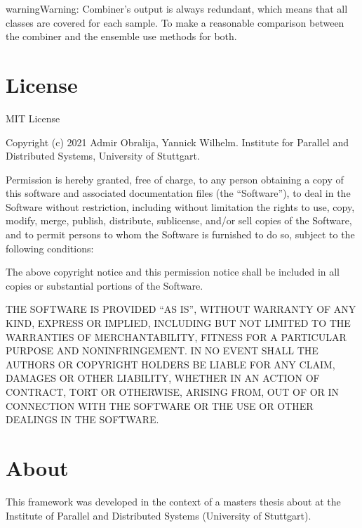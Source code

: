 \documentclass[letterpaper,10pt,english]{sphinxmanual}
\begin{document}
\begin{sphinxadmonition}{warning}{Warning:}
\sphinxAtStartPar
Combiner’s output is always redundant, which means that all classes are covered for each sample.
To make a reasonable comparison between the combiner and the ensemble use  methods for both.
\end{sphinxadmonition}


\chapter{License}
\label{\detokenize{license:license}}\label{\detokenize{license::doc}}
\sphinxAtStartPar
MIT License

\sphinxAtStartPar
Copyright (c) 2021 Admir Obralija, Yannick Wilhelm.
Institute for Parallel and Distributed Systems, University of Stuttgart.

\sphinxAtStartPar
Permission is hereby granted, free of charge, to any person obtaining a copy
of this software and associated documentation files (the “Software”), to deal
in the Software without restriction, including without limitation the rights
to use, copy, modify, merge, publish, distribute, sublicense, and/or sell
copies of the Software, and to permit persons to whom the Software is
furnished to do so, subject to the following conditions:

\sphinxAtStartPar
The above copyright notice and this permission notice shall be included in all
copies or substantial portions of the Software.

\sphinxAtStartPar
THE SOFTWARE IS PROVIDED “AS IS”, WITHOUT WARRANTY OF ANY KIND, EXPRESS OR
IMPLIED, INCLUDING BUT NOT LIMITED TO THE WARRANTIES OF MERCHANTABILITY,
FITNESS FOR A PARTICULAR PURPOSE AND NONINFRINGEMENT. IN NO EVENT SHALL THE
AUTHORS OR COPYRIGHT HOLDERS BE LIABLE FOR ANY CLAIM, DAMAGES OR OTHER
LIABILITY, WHETHER IN AN ACTION OF CONTRACT, TORT OR OTHERWISE, ARISING FROM,
OUT OF OR IN CONNECTION WITH THE SOFTWARE OR THE USE OR OTHER DEALINGS IN THE
SOFTWARE.


\chapter{About}
\label{\detokenize{about:about}}\label{\detokenize{about::doc}}
\sphinxAtStartPar
This framework was developed in the context of a masters thesis about
at the Institute of Parallel and Distributed Systems (University of Stuttgart).
\end{document}
